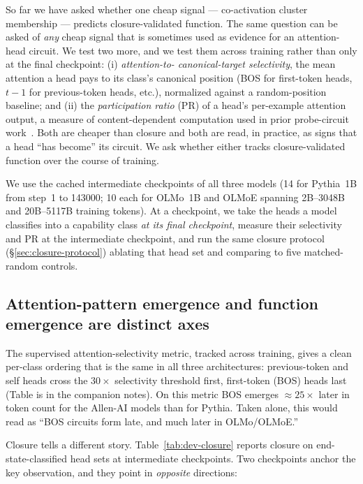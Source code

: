 \documentclass[11pt]{article}
\begin{document}
So far we have asked whether one cheap signal --- co-activation cluster
membership --- predicts closure-validated function. The same question can
be asked of \emph{any} cheap signal that is sometimes used as evidence for
an attention-head circuit. We test two more, and we test them across
training rather than only at the final checkpoint: (i) \emph{attention-to-
canonical-target selectivity}, the mean attention a head pays to its
class's canonical position (BOS for first-token heads, $t-1$ for
previous-token heads, etc.), normalized against a random-position
baseline; and (ii) the \emph{participation ratio} (PR) of a head's
per-example attention output, a measure of content-dependent computation
used in prior probe-circuit work~\cite{xu2026}. Both are cheaper than
closure and both are read, in practice, as signs that a head ``has become''
its circuit. We ask whether either tracks closure-validated function over
the course of training.

We use the cached intermediate checkpoints of all three models (14 for
Pythia~1B from step~1 to 143000; 10 each for OLMo~1B and OLMoE spanning
2B--3048B and 20B--5117B training tokens). At a checkpoint, we take the
heads a model classifies into a capability class \emph{at its final
checkpoint}, measure their selectivity and PR at the intermediate
checkpoint, and run the same closure protocol (\S\ref{sec:closure-protocol})
ablating that head set and comparing to five matched-random controls.

\subsection{Attention-pattern emergence and function emergence are
distinct axes}

The supervised attention-selectivity metric, tracked across training,
gives a clean per-class ordering that is the same in all three
architectures: previous-token and self heads cross the $30\times$
selectivity threshold first, first-token (BOS) heads last (Table is in the
companion notes). On this metric BOS emerges $\approx 25\times$ later in
token count for the Allen-AI models than for Pythia. Taken alone, this
would read as ``BOS circuits form late, and much later in OLMo/OLMoE.''

Closure tells a different story. Table~\ref{tab:dev-closure} reports
closure on end-state-classified head sets at intermediate checkpoints.
Two checkpoints anchor the key observation, and they point in
\emph{opposite} directions:
\end{document}
